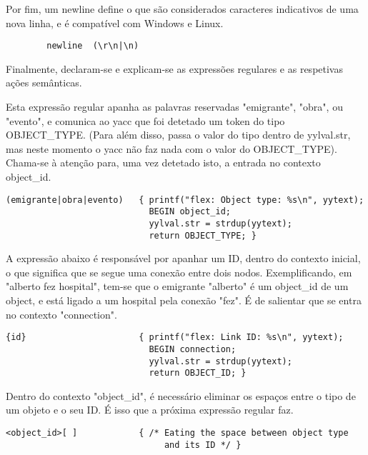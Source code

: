 \documentclass[a4paper]{article}
\begin{document}
\par Por fim, um newline define o que são considerados caracteres indicativos de uma nova linha, e é compatível com Windows e Linux.
\begin{lstlisting}
        newline  (\r\n|\n)
\end{lstlisting}


\bigskip
\bigskip

\par Finalmente, declaram-se e explicam-se as expressões regulares e as respetivas ações semânticas.
\par Esta expressão regular apanha as palavras reservadas "emigrante", "obra", ou "evento", e comunica ao yacc que foi detetado um token do tipo OBJECT\_TYPE. (Para além disso, passa o valor do tipo dentro de yylval.str, mas neste momento o yacc não faz nada com o valor do OBJECT\_TYPE). Chama-se à atenção para, uma vez detetado isto, a entrada no contexto object\_id.

\lstset{language=tex}
\begin{lstlisting}
(emigrante|obra|evento)   { printf("flex: Object type: %s\n", yytext);             
                            BEGIN object_id; 
                            yylval.str = strdup(yytext); 
                            return OBJECT_TYPE; }
\end{lstlisting}

\bigskip
\par A expressão abaixo é responsável por apanhar um ID, dentro do contexto inicial, o que significa que se segue uma conexão entre dois nodos. Exemplificando, em "alberto fez hospital", tem-se que o emigrante "alberto" é um object\_id de um object, e está ligado a um hospital pela conexão "fez". É de salientar que se entra no contexto "connection".

\lstset{language=tex}
\begin{lstlisting}
{id}                      { printf("flex: Link ID: %s\n", yytext);                                                
                            BEGIN connection; 
                            yylval.str = strdup(yytext); 
                            return OBJECT_ID; }
\end{lstlisting}

\bigskip
\par Dentro do contexto "object\_id", é necessário eliminar os espaços entre o tipo de um objeto e o seu ID. É isso que a próxima expressão regular faz.

\lstset{language=tex}
\begin{lstlisting}
<object_id>[ ]            { /* Eating the space between object type 
                               and its ID */ }
\end{lstlisting}
\end{document}
